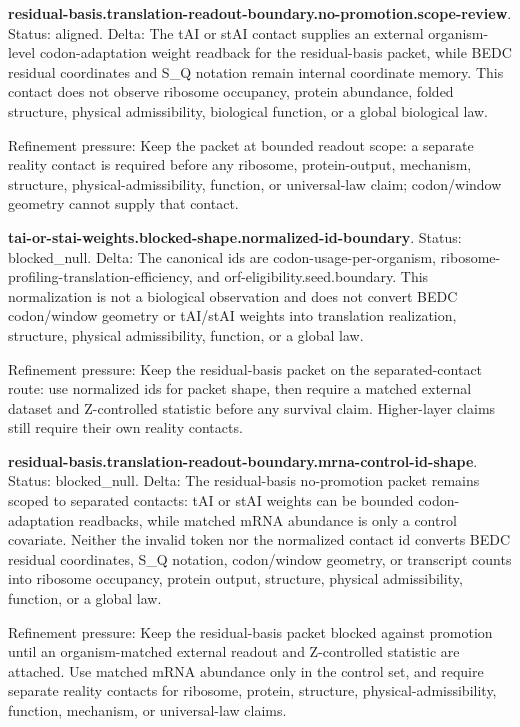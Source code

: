 \textbf{residual-basis.translation-readout-boundary.no-promotion.scope-review}. Status: aligned. Delta: The tAI or stAI contact supplies an external organism-level codon-adaptation weight readback for the residual-basis packet, while BEDC residual coordinates and S\_Q notation remain internal coordinate memory. This contact does not observe ribosome occupancy, protein abundance, folded structure, physical admissibility, biological function, or a global biological law.

Refinement pressure: Keep the packet at bounded readout scope: a separate reality contact is required before any ribosome, protein-output, mechanism, structure, physical-admissibility, function, or universal-law claim; codon/window geometry cannot supply that contact.

\textbf{tai-or-stai-weights.blocked-shape.normalized-id-boundary}. Status: blocked\_null. Delta: The canonical ids are codon-usage-per-organism, ribosome-profiling-translation-efficiency, and orf-eligibility.seed.boundary. This normalization is not a biological observation and does not convert BEDC codon/window geometry or tAI/stAI weights into translation realization, structure, physical admissibility, function, or a global law.

Refinement pressure: Keep the residual-basis packet on the separated-contact route: use normalized ids for packet shape, then require a matched external dataset and Z-controlled statistic before any survival claim. Higher-layer claims still require their own reality contacts.

\textbf{residual-basis.translation-readout-boundary.mrna-control-id-shape}. Status: blocked\_null. Delta: The residual-basis no-promotion packet remains scoped to separated contacts: tAI or stAI weights can be bounded codon-adaptation readbacks, while matched mRNA abundance is only a control covariate. Neither the invalid token nor the normalized contact id converts BEDC residual coordinates, S\_Q notation, codon/window geometry, or transcript counts into ribosome occupancy, protein output, structure, physical admissibility, function, or a global law.

Refinement pressure: Keep the residual-basis packet blocked against promotion until an organism-matched external readout and Z-controlled statistic are attached. Use matched mRNA abundance only in the control set, and require separate reality contacts for ribosome, protein, structure, physical-admissibility, function, mechanism, or universal-law claims.

